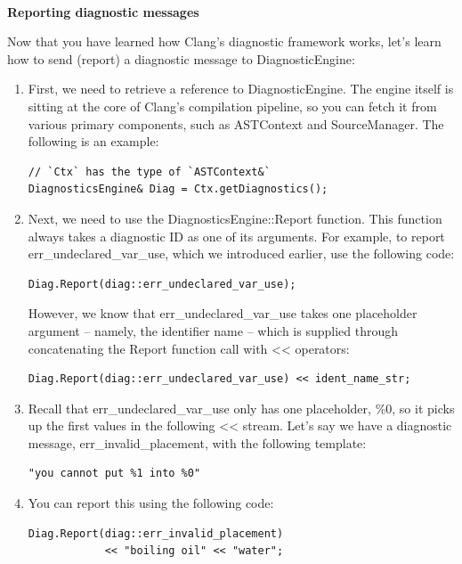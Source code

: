 \hspace*{\fill} \\ %
\noindent
\textbf{Reporting diagnostic messages}

Now that you have learned how Clang's diagnostic framework works, let's learn how to send (report) a diagnostic message to DiagnosticEngine:

\begin{enumerate}
\item First, we need to retrieve a reference to DiagnosticEngine. The engine itself is sitting at the core of Clang's compilation pipeline, so you can fetch it from various primary components, such as ASTContext and SourceManager. The following is an example:

\begin{lstlisting}[style=styleJavaScript]
// `Ctx` has the type of `ASTContext&`
DiagnosticsEngine& Diag = Ctx.getDiagnostics();
\end{lstlisting}

\item Next, we need to use the DiagnosticsEngine::Report function. This function always takes a diagnostic ID as one of its arguments. For example, to report err\_undeclared\_var\_use, which we introduced earlier, use the following code:

\begin{lstlisting}[style=styleJavaScript]
Diag.Report(diag::err_undeclared_var_use);
\end{lstlisting}

However, we know that err\_undeclared\_var\_use takes one placeholder argument – namely, the identifier name – which is supplied through concatenating the Report function call with << operators:

\begin{lstlisting}[style=styleJavaScript]
Diag.Report(diag::err_undeclared_var_use) << ident_name_str;
\end{lstlisting}

\item Recall that err\_undeclared\_var\_use only has one placeholder, \%0, so it picks up the first values in the following << stream. Let's say we have a diagnostic message, err\_invalid\_placement, with the following template:

\begin{lstlisting}[style=styleJavaScript]
"you cannot put %1 into %0"
\end{lstlisting}

\item You can report this using the following code:
\begin{lstlisting}[style=styleJavaScript]
Diag.Report(diag::err_invalid_placement)
            << "boiling oil" << "water";
\end{lstlisting}



\end{enumerate}
